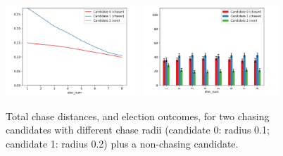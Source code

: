 \begin{figure}[ht]
\centering
\includegraphics[width=0.45\textwidth]{assets/diff_chase_radii_dists.png}
\includegraphics[width=0.45\textwidth]{assets/diff_chase_radii_winners.png}
\caption{Total chase distances, and election outcomes, for two chasing
candidates with different chase radii (candidate 0: radius 0.1; candidate 1:
radius 0.2) plus a non-chasing candidate.}
\label{diff_chase_radius}

\end{figure}










